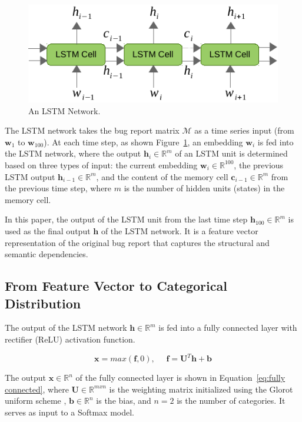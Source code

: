 \begin{figure}[t]
\centering
\includegraphics[scale=0.9]{figures/lstm2.pdf}
\caption{An LSTM Network.}
\label{fig:lstm2}
\end{figure}

The LSTM network takes the bug report matrix $\mathcal{M}$ as a time series input (from $\mathbf{w}_1$ to $\mathbf{w}_{100}$). At each time step, as shown Figure~\ref{fig:lstm2}, an embedding $\mathbf{w}_i$ is fed into the LSTM network, where the output $\mathbf{h}_i \in \mathbb{R}^{m}$ of an LSTM unit is determined based on three types of input: the current embedding $\mathbf{w}_i \in \mathbb{R}^{100}$, the previous LSTM output $\mathbf{h}_{i-1} \in \mathbb{R}^{m}$, and the content of the memory cell $\mathbf{c}_{i-1} \in \mathbb{R}^{m}$ from the previous time step, where $m$ is the number of hidden units (states) in the memory cell.

In this paper, the output of the LSTM unit from the last time step $\mathbf{h}_{100} \in \mathbb{R}^{m}$ is used as the final output $\mathbf{h}$ of the LSTM network. It is a feature vector representation of the original bug report that captures the structural and semantic dependencies.

\subsection{From Feature Vector to Categorical Distribution}
\label{sec:categorical distribution}
The output of the LSTM network $\mathbf{h} \in \mathbb{R}^{m}$ is fed into a fully connected layer with rectifier (ReLU) \cite{Nair:2010:RLU:3104322.3104425} activation function.

\begin{equation}
  \mathbf{x} = max(\mathbf{f}, 0), \:\:\:\:\:\: \mathbf{f} = \mathbf{U}^T \mathbf{h} + \mathbf{b}
\label{eq:fully connected}
\end{equation}

The output $\mathbf{x} \in \mathbb{R}^{n}$ of the fully connected layer is shown in Equation~\ref{eq:fully connected}, where $\mathbf{U} \in \mathbb{R}^{mxn}$ is the weighting matrix initialized using the Glorot uniform scheme \cite{DBLP:journals/jmlr/GlorotB10}, $\mathbf{b} \in \mathbb{R}^{n}$ is the bias, and $n=2$ is the number of categories. It serves as input to a Softmax model.

